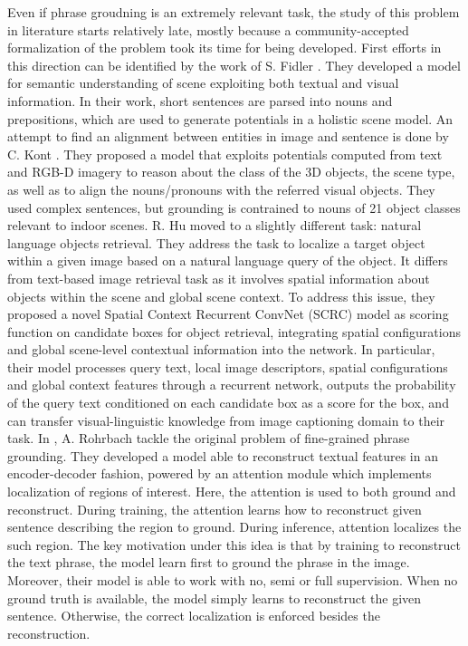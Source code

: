 Even if phrase groudning is an extremely relevant task, the study of
this problem in literature starts relatively late, mostly because a
community-accepted formalization of the problem took its time for
being developed. First efforts in this direction can be identified by
the work of S. Fidler \etal{} \cite{fidler2013sentence}. They
developed a model for semantic understanding of scene exploiting both
textual and visual information. In their work, short sentences are
parsed into nouns and prepositions, which are used to generate
potentials in a holistic scene model. An attempt to find an alignment
between entities in image and sentence is done by C. Kont \etal{}
\cite{kong2014you}. They proposed a model that exploits potentials
computed from text and RGB-D imagery to reason about the class of the
3D objects, the scene type, as well as to align the nouns/pronouns
with the referred visual objects. They used complex sentences, but
grounding is contrained to nouns of 21 object classes relevant to
indoor scenes. R. Hu \etal{} \cite{hu2016natural} moved to a slightly
different task: natural language objects retrieval. They address the
task to localize a target object within a given image based on a
natural language query of the object. It differs from text-based image
retrieval task as it involves spatial information about objects within
the scene and global scene context. To address this issue, they
proposed a novel Spatial Context Recurrent ConvNet (SCRC) model as
scoring function on candidate boxes for object retrieval, integrating
spatial configurations and global scene-level contextual information
into the network. In particular, their model processes query text,
local image descriptors, spatial configurations and global context
features through a recurrent network, outputs the probability of the
query text conditioned on each candidate box as a score for the box,
and can transfer visual-linguistic knowledge from image captioning
domain to their task. In \cite{rohrbach2016grounding}, A. Rohrbach
\etal{} tackle the original problem of fine-grained phrase grounding.
They developed a model able to reconstruct textual features in an
encoder-decoder fashion, powered by an attention module which
implements localization of regions of interest. Here, the attention is
used to both ground and reconstruct. During training, the attention
learns how to reconstruct given sentence describing the region to
ground. During inference, attention localizes the such region. The key
motivation under this idea is that by training to reconstruct the text
phrase, the model learn first to ground the phrase in the image.
Moreover, their model is able to work with no, semi or full
supervision. When no ground truth is available, the model simply
learns to reconstruct the given sentence. Otherwise, the correct
localization is enforced besides the reconstruction.

